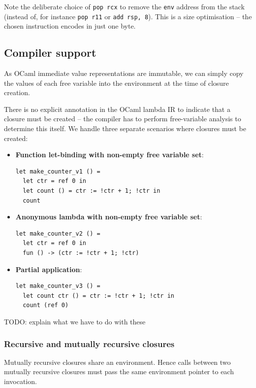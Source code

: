 \documentclass[12pt,a4paper,twoside,openright]{report}
\begin{document}
Note the deliberate choice of \lstinline{pop rcx} to remove the
\lstinline{env} address from the stack (instead of, for instance
\lstinline{pop r11} or \lstinline{add rsp, 8}). This is a size optimisation --
the chosen instruction encodes in just one byte.

\subsection{Compiler support}\label{closures-compiler-support}

As OCaml immediate value representations are immutable, we can simply copy the
values of each free variable into the environment at the time of closure
creation.

There is no explicit annotation in the OCaml lambda IR to indicate that a
closure must be created -- the compiler has to perform free-variable analysis
to determine this itself. We handle three separate scenarios where closures
must be created:

\begin{itemize}
    \item \textbf{Function let-binding with non-empty free variable set}:
      \begin{lstlisting}
let make_counter_v1 () =
  let ctr = ref 0 in
  let count () = ctr := !ctr + 1; !ctr in
  count
      \end{lstlisting}
    \item \textbf{Anonymous lambda with non-empty free variable set}:
      \begin{lstlisting}
let make_counter_v2 () =
  let ctr = ref 0 in
  fun () -> (ctr := !ctr + 1; !ctr)
      \end{lstlisting}
    \item \textbf{Partial application}:
      \begin{lstlisting}
let make_counter_v3 () =
  let count ctr () = ctr := !ctr + 1; !ctr in
  count (ref 0)
      \end{lstlisting}
\end{itemize}

TODO: explain what we have to do with these

\subsubsection{Recursive and mutually recursive closures}

Mutually recursive closures share an environment. Hence calls between two
mutually recursive closures must pass the same environment pointer to each
invocation.
\end{document}
